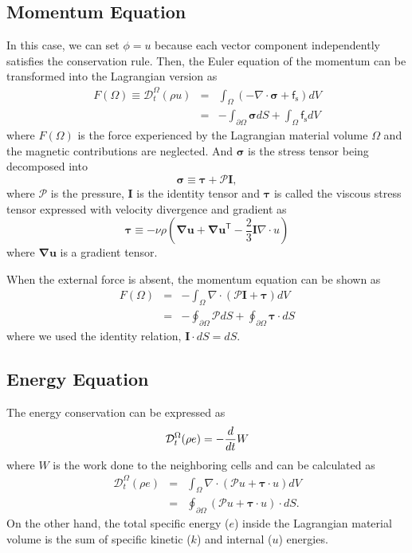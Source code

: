 \documentclass[twocolumn]{aastex63}
\newcommand{\vel}{{u}}
\newcommand{\surf}[0]{S}
\newcommand{\gradT}[1]{\boldsymbol{\nabla#1}}
\newcommand{\pressure}[0]{\mathcal{P}}
\begin{document}
\subsection{Momentum Equation}
In this case, we can set $\phi = \vel$ because each vector component independently satisfies the conservation rule. Then, the Euler equation of the momentum can be transformed into the Lagrangian version as
\begin{eqnarray}
	{F}(\Omega) \equiv \mathcal{D}_t^\Omega(\rho u) &=& \int_\Omega(-\nabla\cdot\boldsymbol{\sigma}  + \mathsf{f}_\text{s}) d V\\
	&=& -\int_{\partial\Omega}\boldsymbol{\sigma}dS +\int_\Omega \mathsf{f}_\text{s} d V
\end{eqnarray}
where $F(\Omega)$ is the force experienced by the Lagrangian material volume $\Omega$ and the magnetic contributions are neglected. And $\boldsymbol{\sigma}$ is the stress tensor being decomposed into
\begin{equation}
	\boldsymbol{\sigma} \equiv \boldsymbol{\tau} +\pressure\boldsymbol{I},
\end{equation}
where $\pressure$ is the pressure, $\boldsymbol{I}$ is the identity tensor and $\boldsymbol{\tau}$ is called the viscous stress tensor expressed with velocity divergence and gradient as
\begin{equation}\label{eq:tau}
	{\boldsymbol {\tau }} \equiv - \nu \rho \left( \gradT{u} + \gradT{u}^\mathsf{T} - \frac{2}{3} {\boldsymbol{I}} {\nabla }{\cdot }\vel\right)
\end{equation}
where $\gradT{u}$ is a gradient tensor.

When the external force is absent, the momentum equation can be shown as
\begin{eqnarray}
	F(\Omega) &=& -\int_{\Omega} \nabla \cdot ({\pressure}\boldsymbol{I} +  \boldsymbol{\tau}) dV \\
	&=& -\oint_{\partial \Omega} \pressure d\surf +\oint_{\partial\Omega} \boldsymbol{\tau}\cdot d\surf
\end{eqnarray}
where we used the identity relation, $\boldsymbol{I}\cdot d\surf = d\surf$. 




\subsection{Energy Equation}
The energy conservation can be expressed as
\begin{equation}
	\mathcal{D}_t^\Omega(\rho e) = -{d\over dt}W 
\end{equation}
where $W$ is the work done to the neighboring cells  and can be calculated as
\begin{eqnarray}
	\mathcal{D}_t^\Omega(\rho e) &=&\int_\Omega \nabla\cdot ({\pressure} \vel + \boldsymbol{\tau}\cdot \vel) dV  \\
	&=& \oint_{\partial \Omega} ({\pressure} \vel+\boldsymbol{\tau}\cdot \vel) \cdot d \surf.
\end{eqnarray}
On the other hand, the total specific energy ($e$) inside the Lagrangian material volume is the sum of specific kinetic ($k$) and internal ($u$) energies.
\end{document}
